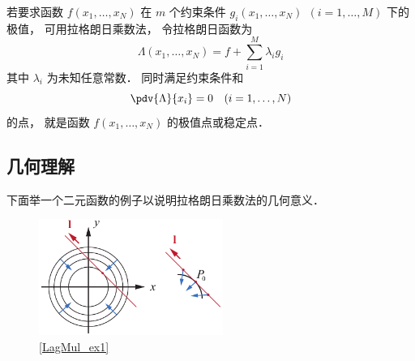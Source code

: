 

若要求函数 $f(x_1,\dots, x_N)$ 在 $m$ 个约束条件 $g_i(x_1, \dots, x_N)\ \ (i = 1,\dots, M)$ 下的极值， 可用拉格朗日乘数法， 令拉格朗日函数为
\begin{equation}
\Lambda(x_1,\dots, x_N) = f + \sum_{i=1}^M \lambda_i g_i
\end{equation} 
其中 $\lambda_i$ 为未知任意常数． 同时满足约束条件和
\begin{equation}
\pdv{\Lambda}{x_i} = 0 \quad (i = 1,\dots, N)
\end{equation}
的点， 就是函数 $f(x_1, \dots, x_N)$ 的极值点或稳定点．

\subsection{几何理解}

下面举一个二元函数的例子以说明拉格朗日乘数法的几何意义．

\begin{figure}[ht]
\centering
\includegraphics[width=6cm]{./figures/LagMul1.pdf}
\caption{\autoref{LagMul_ex1}} \label{LagMul_fig1}
\end{figure}

